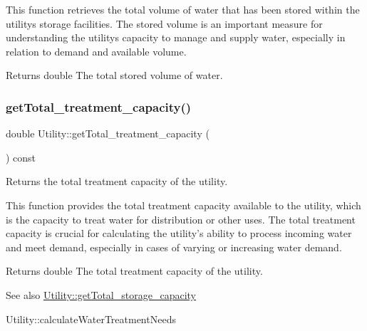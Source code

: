 This function retrieves the total volume of water that has been stored within the utility\textquotesingle{}s storage facilities. The stored volume is an important measure for understanding the utility\textquotesingle{}s capacity to manage and supply water, especially in relation to demand and available volume.

\begin{DoxyReturn}{Returns}
double The total stored volume of water. 
\end{DoxyReturn}
\mbox{\label{classUtility_a6ab2e5b8aec47bcfed522c98ea1b5f79}} 
\subsubsection{\texorpdfstring{get\+Total\+\_\+treatment\+\_\+capacity()}{getTotal\_treatment\_capacity()}}
{\footnotesize\ttfamily double Utility\+::get\+Total\+\_\+treatment\+\_\+capacity (\begin{DoxyParamCaption}{ }\end{DoxyParamCaption}) const}



Returns the total treatment capacity of the utility. 

This function provides the total treatment capacity available to the utility, which is the capacity to treat water for distribution or other uses. The total treatment capacity is crucial for calculating the utility’s ability to process incoming water and meet demand, especially in cases of varying or increasing water demand.

\begin{DoxyReturn}{Returns}
double The total treatment capacity of the utility.
\end{DoxyReturn}
\begin{DoxySeeAlso}{See also}
\mbox{\hyperlink{classUtility_a16f8269dc5f80c1d079c49f33495f620}{Utility\+::get\+Total\+\_\+storage\+\_\+capacity}} 

Utility\+::calculate\+Water\+Treatment\+Needs 
\end{DoxySeeAlso}
\mbox{\label{classUtility_a1fd8aedeaf56d674fd024dac1f11b20c}} 
